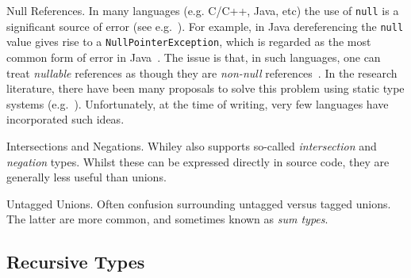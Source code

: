 \begin{insight}{Null References.}  In many languages (e.g. C/C++,
  Java, etc) the use of \lstinline{null} is a significant source of
  error (see e.g.~\cite{Hoa09}).  For example, in Java dereferencing
  the \lstinline{null} value gives rise to a
  \lstinline{NullPointerException}, which is regarded as the most
  common form of error in Java~\cite{XYZ}.  The issue is that, in such
  languages, one can treat {\em nullable} references as though they
  are {\em non-null} references~\cite{Pier02}.  In the research
  literature, there have been many proposals to solve this problem
  using static type systems
  (e.g.~\cite{PQVHV01,FL03,KH07,CFJJ06,CJ07,MPPD08,Hub08,HJP08}).
  Unfortunately, at the time of writing, very few languages have
  incorporated such ideas.
\end{insight}

\begin{insight}{Intersections and Negations.}
  Whiley also supports so-called {\em intersection} and {\em negation}
  types.  Whilst these can be expressed directly in source code, they
  are generally less useful than unions.
\end{insight}

\begin{insight}{Untagged Unions}.  Often confusion surrounding untagged
    versus tagged unions.  The latter are more common, and sometimes
    known as {\em sum types}.
\end{insight}
\subsection{Recursive Types}

